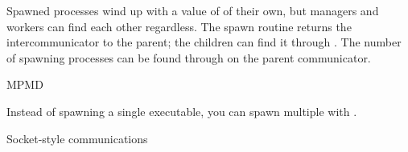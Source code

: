%

Spawned processes wind up with a value of  of their
own, but managers and workers can find each other regardless.
The spawn routine returns the intercommunicator to the parent; the children
can find it through . The number of
spawning processes can be found through
 on the parent communicator.


 {MPMD}

Instead of spawning a single executable, you can spawn multiple with
.

 {Socket-style communications}



